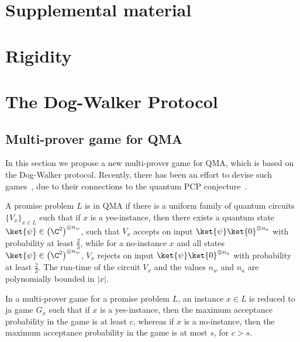 \appendix

\section*{Supplemental material}

\section{Rigidity}
\label{sec:rigidity}





\section{The Dog-Walker Protocol}
\label{sec:dog-walker}



\subsection{Multi-prover game for QMA}\label{sec:qma}

In this section we propose a new multi-prover game for QMA, which is based on the Dog-Walker
protocol.
Recently, there has been an effort to devise such games~\cite{FitzsimonsV15,Ji16,natarajan2016robust},
due to their connections to the quantum PCP conjecture~\cite{AharonovAV13}.


A promise problem $L$ is in QMA if there is a uniform family
of quantum circuits $\{V_x\}_{x \in L}$ such that if $x$ is a yes-instance, then there exists a
quantum state $\ket{\psi} \in \left(\C^2\right)^{\otimes n_w}$, such that
$V_x$  accepts on input $\ket{\psi}\ket{0}^{\otimes n_a}$ with probability at least
$\frac{2}{3}$, while for a no-instance $x$ and  all states $\ket{\psi} \in
\left(\C^2\right)^{\otimes n_w}$, $V_x$
rejects on input $\ket{\psi}\ket{0}^{\otimes n_a}$ with probability at
least $\frac{2}{3}$. The run-time of the circuit $V_x$ and the values $n_w$ and $n_a$ are polynomially bounded in $|x|$.

 In a multi-prover game for a promise problem $L$, an
 instance $x \in L$ is reduced to ja game $G_x$ such that if $x$ is a yes-instance, then the maximum
 acceptance probability in the game is at least $c$, whereas if $x$ is a
 no-instance,
 then the maximum acceptance probability in the game is  at most $s$, for $c
 > s$.

